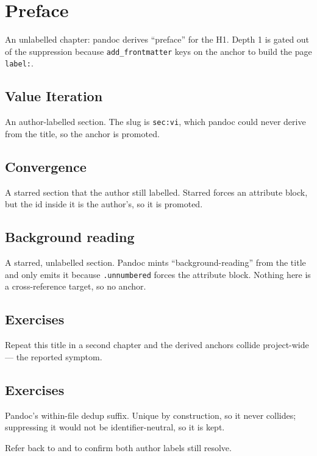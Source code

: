 \chapter*{Preface}

An unlabelled chapter: pandoc derives ``preface'' for the H1. Depth 1 is
gated out of the suppression because \texttt{add\_frontmatter} keys on the
anchor to build the page \texttt{label:}.

\section{Value Iteration}
\label{sec:vi}

An author-labelled section. The slug is \texttt{sec:vi}, which pandoc could
never derive from the title, so the anchor is promoted.

\section*{Convergence}
\label{sec:conv}

A starred section that the author still labelled. Starred forces an
attribute block, but the id inside it is the author's, so it is promoted.

\section*{Background reading}

A starred, unlabelled section. Pandoc mints ``background-reading'' from the
title and only emits it because \texttt{.unnumbered} forces the attribute
block. Nothing here is a cross-reference target, so no anchor.

\section*{Exercises}

Repeat this title in a second chapter and the derived anchors collide
project-wide --- the reported symptom.

\section*{Exercises}

Pandoc's within-file dedup suffix. Unique by construction, so it never
collides; suppressing it would not be identifier-neutral, so it is kept.

Refer back to  and  to confirm both author
labels still resolve.
